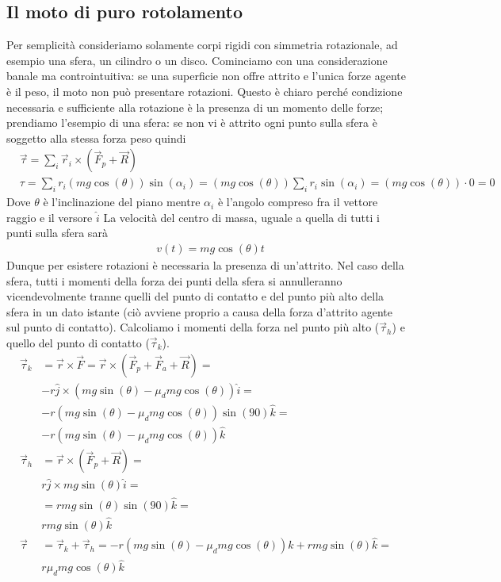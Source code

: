 \documentclass[10pt,a4paper]{article}
\begin{document}
\subsection{Il moto di puro rotolamento}
Per semplicità consideriamo solamente corpi rigidi con simmetria rotazionale, ad esempio una sfera, un cilindro o un disco. Cominciamo con una considerazione banale ma controintuitiva: se una superficie non offre attrito e l'unica forze agente è il peso, il moto non può presentare rotazioni. Questo è chiaro perché condizione necessaria e sufficiente alla rotazione è la presenza di un momento delle forze; prendiamo l'esempio di una sfera: se non vi è attrito ogni punto sulla sfera è soggetto alla stessa forza peso quindi
\begin{align*}
	&\vec{\tau} = \sum_i \vec{r}_i \times (\vec{F}_p + \vec{R})\\
	&\tau = \sum_i r_i (mg \cos(\theta))\sin(\alpha_i) = (mg \cos(\theta)) \sum_i r_i\sin(\alpha_i)= (mg \cos(\theta))\cdot 0 = 0
\end{align*} 
Dove $\theta$ è l'inclinazione del piano mentre $\alpha_i$ è l'angolo compreso fra il vettore raggio e il versore $\hat{i}$
La velocità del centro di massa, uguale a quella di tutti i punti sulla sfera sarà
\begin{align*}
	&v(t) = mg \cos(\theta ) t
\end{align*}
Dunque per esistere rotazioni è necessaria la presenza di un'attrito. Nel caso della sfera, tutti i momenti della forza dei punti della sfera si annulleranno vicendevolmente tranne quelli del punto di contatto e del punto più alto della sfera in un dato istante (ciò avviene proprio a causa della forza d'attrito agente sul punto di contatto). Calcoliamo i momenti della forza nel punto più alto ($\vec{\tau}_h$) e quello del punto di contatto ($\vec{\tau}_k$).
\begin{align*}
	\vec{\tau}_k &= \vec{r} \times \vec{F} = \vec{r} \times (\vec{F}_{p} + \vec{F}_{a} + \vec{R}) =\\
	& -r\hat{j} \times (mg \sin(\theta) - \mu_d mg \cos(\theta))\hat{i} =\\
	& -r (mg \sin(\theta) - \mu_d mg \cos(\theta)) \sin(90) \hat{k} =\\
	& -r (mg \sin(\theta) - \mu_d mg \cos(\theta)) \hat{k}\\
	\vec{\tau}_h &= \vec{r} \times (\vec{F}_{p} + \vec{R}) =\\
	& r\hat{j} \times mg \sin(\theta)\hat{i} =\\
	& = r mg \sin(\theta)\sin(90) \hat{k} =\\
	& r mg \sin(\theta) \hat{k}\\
	\vec{\tau} &= \vec{\tau}_k + \vec{\tau}_h = -r (mg \sin(\theta) - \mu_d mg \cos(\theta)) \hat{k} + r mg \sin(\theta) \hat{k} = \\
	& r\mu_d mg \cos(\theta) \hat{k}
\end{align*} 
\end{document}
